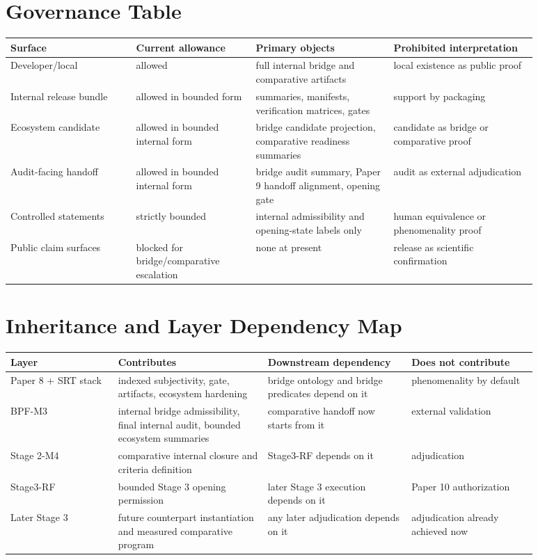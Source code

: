 \documentclass[11pt,a4paper]{article}
\theoremstyle{definition}
\begin{document}
\section{Governance Table}
\begin{center}
\small
\begin{tabularx}{\linewidth}{@{}p{0.21\linewidth}p{0.2\linewidth}p{0.23\linewidth}p{0.24\linewidth}@{}}
\toprule
Surface & Current allowance & Primary objects & Prohibited interpretation \\
\midrule
Developer/local & allowed & full internal bridge and comparative artifacts & local existence as public proof \\
Internal release bundle & allowed in bounded form & summaries, manifests, verification matrices, gates & support by packaging \\
Ecosystem candidate & allowed in bounded internal form & bridge candidate projection, comparative readiness summaries & candidate as bridge or comparative proof \\
Audit-facing handoff & allowed in bounded internal form & bridge audit summary, Paper 9 handoff alignment, opening gate & audit as external adjudication \\
Controlled statements & strictly bounded & internal admissibility and opening-state labels only & human equivalence or phenomenality proof \\
Public claim surfaces & blocked for bridge/comparative escalation & none at present & release as scientific confirmation \\
\bottomrule
\end{tabularx}
\end{center}

\section{Inheritance and Layer Dependency Map}
\begin{center}
\small
\begin{tabularx}{\linewidth}{@{}p{0.18\linewidth}p{0.25\linewidth}p{0.24\linewidth}p{0.21\linewidth}@{}}
\toprule
Layer & Contributes & Downstream dependency & Does not contribute \\
\midrule
Paper 8 + SRT stack & indexed subjectivity, gate, artifacts, ecosystem hardening & bridge ontology and bridge predicates depend on it & phenomenality by default \\
BPF-M3 & internal bridge admissibility, final internal audit, bounded ecosystem summaries & comparative handoff now starts from it & external validation \\
Stage 2-M4 & comparative internal closure and criteria definition & Stage3-RF depends on it & adjudication \\
Stage3-RF & bounded Stage 3 opening permission & later Stage 3 execution depends on it & Paper 10 authorization \\
Later Stage 3 & future counterpart instantiation and measured comparative program & any later adjudication depends on it & adjudication already achieved now \\
\bottomrule
\end{tabularx}
\end{center}
\end{document}
